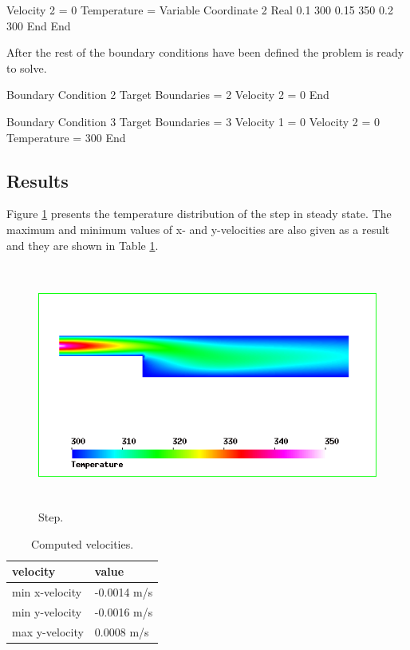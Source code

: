 \begin{flushleft}
  Velocity 2 = 0
  Temperature = Variable Coordinate 2
    Real 
      0.1    300
      0.15   350
      0.2    300
    End
End
\ttend

After the rest of the boundary conditions have been defined the problem is ready to solve.

\ttbegin
Boundary Condition 2
  Target Boundaries = 2
  Velocity 2 = 0
End

Boundary Condition 3
  Target Boundaries = 3
  Velocity 1 = 0
  Velocity 2 = 0
  Temperature = 300
End
\ttend

\subsection*{Results}

Figure \ref{fg:comp_step_temp} presents the temperature distribution of the step in steady state. The maximum and minimum values of x- and y-velocities are also given as a result and they are shown in Table \ref{tb:velocities}.

\begin{figure}[h]
\centering
\includegraphics[height=80mm]{comp_step_temp.png}
\caption{Step.}\label{fg:comp_step_temp}
\end{figure}

\begin{table}[h]
\caption{Computed velocities.}
\label{tb:velocities}
\begin{center}
\begin{tabular}{ll} \hline
velocity  & value \\ \hline
min x-velocity & -0.0014 m/s\\
min y-velocity & -0.0016 m/s        \\
max y-velocity & 0.0008 m/s      \\ \hline
\end{tabular}
\end{center}
\end{table}

\end{flushleft}

\vfill
